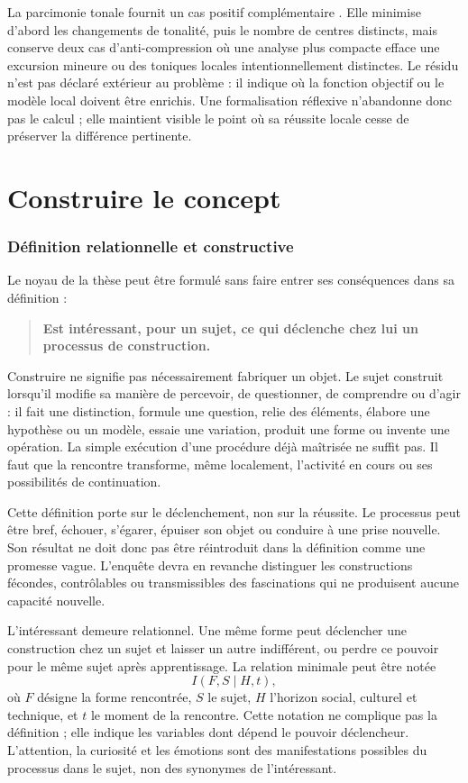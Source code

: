 \documentclass[11pt,a4paper]{article}
\begin{document}
La parcimonie tonale fournit un cas positif complémentaire
\parencite{pachet2026tonalparsimony}. Elle minimise d'abord les changements de
tonalité, puis le nombre de centres distincts, mais conserve deux cas
d'anti-compression où une analyse plus compacte efface une excursion mineure ou
des toniques locales intentionnellement distinctes. Le résidu n'est pas déclaré
extérieur au problème : il indique où la fonction objectif ou le modèle local
doivent être enrichis. Une formalisation réflexive n'abandonne donc pas le
calcul ; elle maintient visible le point où sa réussite locale cesse de préserver
la différence pertinente.

\part{Construire le concept}

\section{Définition relationnelle et constructive}

Le noyau de la thèse peut être formulé sans faire entrer ses conséquences dans
sa définition :

\begin{quote}
\textbf{Est intéressant, pour un sujet, ce qui déclenche chez lui un processus
de construction.}
\end{quote}

Construire ne signifie pas nécessairement fabriquer un objet. Le sujet construit
lorsqu'il modifie sa manière de percevoir, de questionner, de comprendre ou
d'agir : il fait une distinction, formule une question, relie des éléments,
élabore une hypothèse ou un modèle, essaie une variation, produit une forme ou
invente une opération. La simple exécution d'une procédure déjà maîtrisée ne
suffit pas. Il faut que la rencontre transforme, même localement, l'activité en
cours ou ses possibilités de continuation.

Cette définition porte sur le déclenchement, non sur la réussite. Le processus
peut être bref, échouer, s'égarer, épuiser son objet ou conduire à une prise
nouvelle. Son résultat ne doit donc pas être réintroduit dans la définition
comme une promesse vague. L'enquête devra en revanche distinguer les
constructions fécondes, contrôlables ou transmissibles des fascinations qui ne
produisent aucune capacité nouvelle.

L'intéressant demeure relationnel. Une même forme peut déclencher une
construction chez un sujet et laisser un autre indifférent, ou perdre ce pouvoir
pour le même sujet après apprentissage. La relation minimale peut être notée
\[
  I(F,S\mid H,t),
\]
où \(F\) désigne la forme rencontrée, \(S\) le sujet, \(H\) l'horizon social,
culturel et technique, et \(t\) le moment de la rencontre. Cette notation ne
complique pas la définition ; elle indique les variables dont dépend le pouvoir
déclencheur. L'attention, la curiosité et les émotions sont des manifestations
possibles du processus dans le sujet, non des synonymes de l'intéressant.
\end{document}
